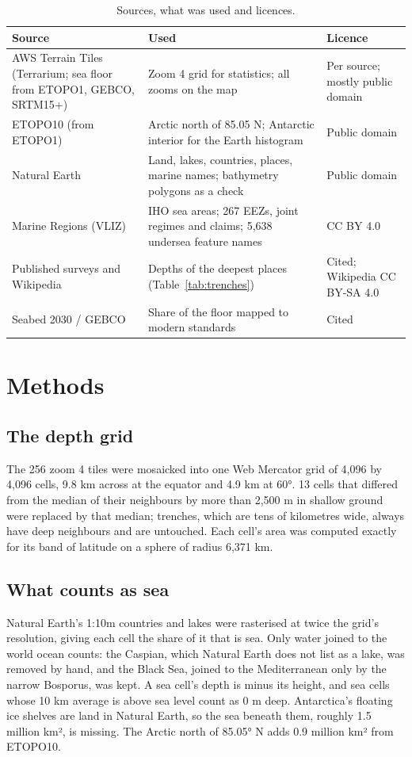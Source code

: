 \documentclass[11pt,a4paper]{article}
\begin{document}
\begin{table}[tbp]\centering\small\caption{Sources, what was used and licences.}\label{tab:sources}\begin{tabular}{>{\raggedright\arraybackslash}p{3.8cm}>{\raggedright\arraybackslash}p{7.4cm}>{\raggedright\arraybackslash}p{3.2cm}}\toprule Source & Used & Licence\\\midrule
AWS Terrain Tiles (Terrarium; sea floor from ETOPO1, GEBCO, SRTM15+) & Zoom 4 grid for statistics; all zooms on the map & Per source; mostly public domain\\
ETOPO10 (from ETOPO1) & Arctic north of 85.05 N; Antarctic interior for the Earth histogram & Public domain\\
Natural Earth & Land, lakes, countries, places, marine names; bathymetry polygons as a check & Public domain\\
Marine Regions (VLIZ) & IHO sea areas; 267 EEZs, joint regimes and claims; 5,638 undersea feature names & CC BY 4.0\\
Published surveys and Wikipedia & Depths of the deepest places (Table~\ref{tab:trenches}) & Cited; Wikipedia CC BY-SA 4.0\\
Seabed 2030 / GEBCO & Share of the floor mapped to modern standards & Cited\\
\bottomrule\end{tabular}\end{table}

\section{Methods}
\subsection{The depth grid}
The 256 zoom 4 tiles were mosaicked into one Web Mercator grid of 4,096 by 4,096 cells, 9.8 km across at the equator and 4.9 km at 60°. 13 cells that differed from the median of their neighbours by more than 2,500 m in shallow ground were replaced by that median; trenches, which are tens of kilometres wide, always have deep neighbours and are untouched. Each cell's area was computed exactly for its band of latitude on a sphere of radius 6,371 km.

\subsection{What counts as sea}
Natural Earth's 1:10m countries and lakes were rasterised at twice the grid's resolution, giving each cell the share of it that is sea. Only water joined to the world ocean counts: the Caspian, which Natural Earth does not list as a lake, was removed by hand, and the Black Sea, joined to the Mediterranean only by the narrow Bosporus, was kept. A sea cell's depth is minus its height, and sea cells whose 10 km average is above sea level count as 0 m deep. Antarctica's floating ice shelves are land in Natural Earth, so the sea beneath them, roughly 1.5 million km², is missing. The Arctic north of 85.05° N adds 0.9 million km² from ETOPO10.
\end{document}
